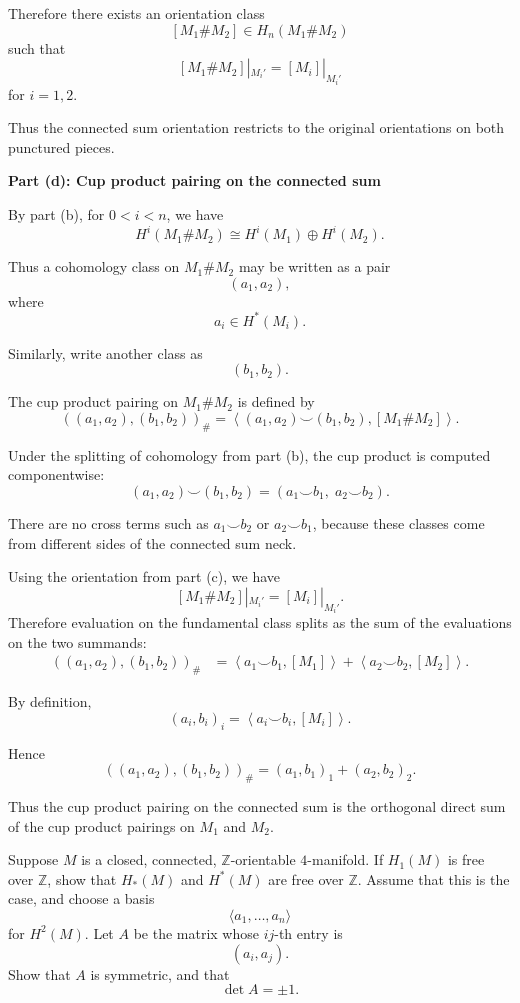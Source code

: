 \begin{solution}
Therefore there exists an orientation class
\[
[M_1\#M_2]\in H_n(M_1\#M_2)
\]
such that
\[
\boxed{
	[M_1\#M_2]|_{M_i'}
	=
	[M_i]|_{M_i'}
}
\]
for \(i=1,2\).

Thus the connected sum orientation restricts to the original orientations on
both punctured pieces.


\medskip
\noindent\textbf{Part (d): Cup product pairing on the connected sum}\par
\smallskip


By part (b), for \(0<i<n\), we have
\[
H^i(M_1\#M_2)
\cong
H^i(M_1)\oplus H^i(M_2).
\]

Thus a cohomology class on \(M_1\#M_2\) may be written as a pair
\[
(a_1,a_2),
\]
where
\[
a_i\in H^*(M_i).
\]

Similarly, write another class as
\[
(b_1,b_2).
\]

The cup product pairing on \(M_1\#M_2\) is defined by
\[
((a_1,a_2),(b_1,b_2))_{\#}
=
\left\langle
(a_1,a_2)\smile (b_1,b_2),
[M_1\#M_2]
\right\rangle.
\]

Under the splitting of cohomology from part (b), the cup product is computed
componentwise:
\[
(a_1,a_2)\smile (b_1,b_2)
=
(a_1\smile b_1,\; a_2\smile b_2).
\]

There are no cross terms such as \(a_1\smile b_2\) or \(a_2\smile b_1\),
because these classes come from different sides of the connected sum neck.

Using the orientation from part (c), we have
\[
[M_1\#M_2]|_{M_i'}
=
[M_i]|_{M_i'}.
\]
Therefore evaluation on the fundamental class splits as the sum of the
evaluations on the two summands:
\[
\begin{aligned}
	((a_1,a_2),(b_1,b_2))_{\#}
	&=
	\left\langle
	a_1\smile b_1,[M_1]
	\right\rangle
	+
	\left\langle
	a_2\smile b_2,[M_2]
	\right\rangle.
\end{aligned}
\]

By definition,
\[
(a_i,b_i)_i
=
\left\langle
a_i\smile b_i,[M_i]
\right\rangle.
\]

Hence
\[
\boxed{
	((a_1,a_2),(b_1,b_2))_{\#}
	=
	(a_1,b_1)_1+(a_2,b_2)_2.
}
\]

Thus the cup product pairing on the connected sum is the orthogonal direct
sum of the cup product pairings on \(M_1\) and \(M_2\).
\end{solution}

\begin{problem}
Suppose \(M\) is a closed, connected, \(\mathbb Z\)-orientable \(4\)-manifold. If \(H_1(M)\) is free over
\(\mathbb Z\), show that \(H_*(M)\) and \(H^*(M)\) are free over \(\mathbb Z\).
Assume that this is the case, and choose a basis
\[
\langle a_1,\ldots,a_n\rangle
\]
for \(H^2(M)\). Let \(A\) be the matrix whose \(ij\)-th entry is
\[
(a_i,a_j).
\]
Show that \(A\) is symmetric, and that
\[
\det A=\pm 1.
\]

\par

\noindent
\end{problem}

